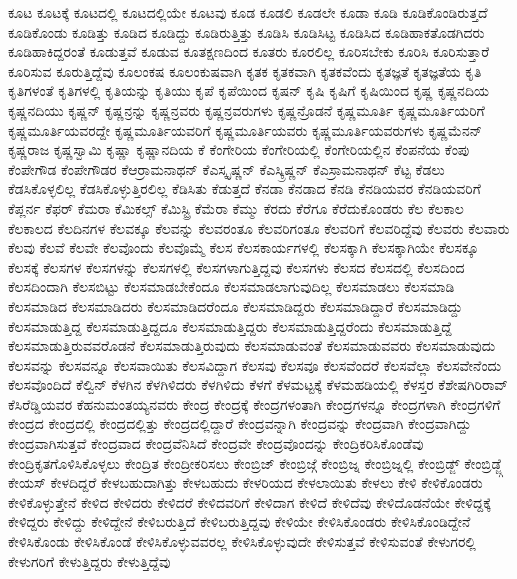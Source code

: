 {ಕೂಟ
ಕೂಟಕ್ಕೆ
ಕೂಟದಲ್ಲಿ
ಕೂಟದಲ್ಲಿಯೇ
ಕೂಟವು
ಕೂಡ
ಕೂಡಲಿ
ಕೂಡಲೇ
ಕೂಡಾ
ಕೂಡಿ
ಕೂಡಿಕೊಂಡಿರುತ್ತದೆ
ಕೂಡಿಕೊಂಡು
ಕೂಡಿತ್ತು
ಕೂಡಿದ
ಕೂಡಿದ್ದು
ಕೂಡಿರುತ್ತಿತ್ತು
ಕೂಡಿಸಿ
ಕೂಡಿಸಿಟ್ಟ
ಕೂಡಿಸಿದ
ಕೂಡಿಹಾಕತೊಡಗಿದರು
ಕೂಡಿಹಾಕಿದ್ದರಂತೆ
ಕೂಡುತ್ತವೆ
ಕೂಡುವ
ಕೂತಕ್ಷಣದಿಂದ
ಕೂತರು
ಕೂರಲಿಲ್ಲ
ಕೂರಿಸಬೇಕು
ಕೂರಿಸಿ
ಕೂರಿಸುತ್ತಾರೆ
ಕೂರಿಸುವ
ಕೂರುತ್ತಿದ್ದೆವು
ಕೂಲಂಕಷ
ಕೂಲಂಕುಷವಾಗಿ
ಕೃತಕ
ಕೃತಕವಾಗಿ
ಕೃತಕವೆಂದು
ಕೃತಜ್ಞತೆ
ಕೃತಜ್ಞತೆಯ
ಕೃತಿ
ಕೃತಿಗಳಂತೆ
ಕೃತಿಗಳಲ್ಲಿ
ಕೃತಿಯನ್ನು
ಕೃತಿಯು
ಕೃಪೆ
ಕೃಪೆಯಿಂದ
ಕೃಷನ್
ಕೃಷಿ
ಕೃಷಿಗೆ
ಕೃಷಿಯಿಂದ
ಕೃಷ್ಣ
ಕೃಷ್ಣನದಿಯ
ಕೃಷ್ಣನದಿಯು
ಕೃಷ್ಣನ್
ಕೃಷ್ಣನ್ರನ್ನು
ಕೃಷ್ಣನ್ರವರು
ಕೃಷ್ಣನ್ರವರುಗಳು
ಕೃಷ್ಣನ್ರೊಡನೆ
ಕೃಷ್ಣಮೂರ್ತಿ
ಕೃಷ್ಣಮೂರ್ತಿಯರಿಗೆ
ಕೃಷ್ಣಮೂರ್ತಿಯವರದ್ದೇ
ಕೃಷ್ಣಮೂರ್ತಿಯವರಿಗೆ
ಕೃಷ್ಣಮೂರ್ತಿಯವರು
ಕೃಷ್ಣಮೂರ್ತಿಯವರುಗಳು
ಕೃಷ್ಣಮೆನನ್
ಕೃಷ್ಣರಾಜ
ಕೃಷ್ಣಸ್ವಾಮಿ
ಕೃಷ್ಣಾ
ಕೃಷ್ಣಾನದಿಯ
ಕೆ
ಕೆಂಗೇರಿಯ
ಕೆಂಗೇರಿಯಲ್ಲಿ
ಕೆಂಗೇರಿಯಲ್ಲಿನ
ಕೆಂಪನೆಯ
ಕೆಂಪು
ಕೆಂಪೇಗೌಡ
ಕೆಂಪೇಗೌಡರ
ಕೆಆರ್ರಾಮನಾಥನ್
ಕೆಎಸ್ಕೃಷ್ಣನ್
ಕೆಎಸ್ಕ್ರಿಷ್ಣನ್
ಕೆಎಸ್ರಾಮನಾಥನ್
ಕೆಟ್ಟ
ಕೆಡಲು
ಕೆಡಸಿಕೊಳ್ಳಲಿಲ್ಲ
ಕೆಡಸಿಕೊಳ್ಳುತ್ತಿರಲಿಲ್ಲ
ಕೆಡಿಸಿತು
ಕೆಡುತ್ತದೆ
ಕೆನಡಾ
ಕೆನಡಾದ
ಕೆನಡಿ
ಕೆನಡಿಯವರ
ಕೆನಡಿಯವರಿಗೆ
ಕೆಪ್ಲರ್ನ
ಕೆಫರ್
ಕೆಮರಾ
ಕೆಮಿಕಲ್ಸ್
ಕೆಮಿಸ್ಟ್ರಿ
ಕೆಮೆರಾ
ಕೆಮ್ಮು
ಕೆರದು
ಕೆರೆಗೂ
ಕೆರೆದುಕೊಂಡರು
ಕೆಲ
ಕೆಲಕಾಲ
ಕೆಲಕಾಲದ
ಕೆಲದಿನಗಳ
ಕೆಲವಕ್ಕೂ
ಕೆಲವನ್ನು
ಕೆಲವರಂತೂ
ಕೆಲವರಿಗಂತೂ
ಕೆಲವರಿಗೆ
ಕೆಲವರಿದ್ದೆವು
ಕೆಲವರು
ಕೆಲವಾರು
ಕೆಲವು
ಕೆಲವೆ
ಕೆಲವೇ
ಕೆಲವೊಂದು
ಕೆಲವೊಮ್ಮೆ
ಕೆಲಸ
ಕೆಲಸಕಾರ್ಯಗಳಲ್ಲಿ
ಕೆಲಸಕ್ಕಾಗಿ
ಕೆಲಸಕ್ಕಾಗಿಯೇ
ಕೆಲಸಕ್ಕೂ
ಕೆಲಸಕ್ಕೆ
ಕೆಲಸಗಳ
ಕೆಲಸಗಳನ್ನು
ಕೆಲಸಗಳಲ್ಲಿ
ಕೆಲಸಗಳಾಗುತ್ತಿದ್ದವು
ಕೆಲಸಗಳು
ಕೆಲಸದ
ಕೆಲಸದಲ್ಲಿ
ಕೆಲಸದಿಂದ
ಕೆಲಸದಿಂದಾಗಿ
ಕೆಲಸಬಿಟ್ಟು
ಕೆಲಸಮಾಡಬೇಕೆಂದೂ
ಕೆಲಸಮಾಡಲಾಗುವುದಿಲ್ಲ
ಕೆಲಸಮಾಡಲು
ಕೆಲಸಮಾಡಿ
ಕೆಲಸಮಾಡಿದ
ಕೆಲಸಮಾಡಿದರು
ಕೆಲಸಮಾಡಿದರೆಂದೂ
ಕೆಲಸಮಾಡಿದ್ದರು
ಕೆಲಸಮಾಡಿದ್ದಾರೆ
ಕೆಲಸಮಾಡಿದ್ದು
ಕೆಲಸಮಾಡುತ್ತಿದ್ದ
ಕೆಲಸಮಾಡುತ್ತಿದ್ದದೂ
ಕೆಲಸಮಾಡುತ್ತಿದ್ದರು
ಕೆಲಸಮಾಡುತ್ತಿದ್ದರೆಂದು
ಕೆಲಸಮಾಡುತ್ತಿದ್ದೆ
ಕೆಲಸಮಾಡುತ್ತಿರುವವರೊಡನೆ
ಕೆಲಸಮಾಡುತ್ತಿರುವುದು
ಕೆಲಸಮಾಡುವಂತೆ
ಕೆಲಸಮಾಡುವವರು
ಕೆಲಸಮಾಡುವುದು
ಕೆಲಸವನ್ನು
ಕೆಲಸವನ್ನೂ
ಕೆಲಸವಾಯಿತು
ಕೆಲಸವಿದ್ದಾಗ
ಕೆಲಸವು
ಕೆಲಸವೂ
ಕೆಲಸವೆಂದರೆ
ಕೆಲಸವೆಲ್ಲಾ
ಕೆಲಸವೇನೆಂದು
ಕೆಲಸವೊಂದಿದೆ
ಕೆಲ್ವಿನ್
ಕೆಳಗಿನ
ಕೆಳಗಿಳಿದರು
ಕೆಳಗಿಳಿದು
ಕೆಳಗೆ
ಕೆಳಮಟ್ಟಕ್ಕೆ
ಕೆಳಮಹಡಿಯಲ್ಲಿ
ಕೆಳಸ್ತರ
ಕೆಶೇಷಗಿರಿರಾವ್
ಕೆಸಿರೆಡ್ಡಿಯವರ
ಕೆಹನುಮಂತಯ್ಯನವರು
ಕೇಂದ್ರ
ಕೇಂದ್ರಕ್ಕೆ
ಕೇಂದ್ರಗಳಂತಾಗಿ
ಕೇಂದ್ರಗಳನ್ನೂ
ಕೇಂದ್ರಗಳಾಗಿ
ಕೇಂದ್ರಗಳಿಗೆ
ಕೇಂದ್ರದ
ಕೇಂದ್ರದಲ್ಲಿ
ಕೇಂದ್ರದಲ್ಲಿತ್ತು
ಕೇಂದ್ರದಲ್ಲಿದ್ದಾರೆ
ಕೇಂದ್ರವನ್ನಾಗಿ
ಕೇಂದ್ರವನ್ನು
ಕೇಂದ್ರವಾಗಿ
ಕೇಂದ್ರವಾಗಿದ್ದು
ಕೇಂದ್ರವಾಗಿಸುತ್ತವೆ
ಕೇಂದ್ರವಾದ
ಕೇಂದ್ರವೆನಿಸಿದೆ
ಕೇಂದ್ರವೇ
ಕೇಂದ್ರವೊಂದನ್ನು
ಕೇಂದ್ರಿಕರಿಸಿಕೊಂಡೆವು
ಕೇಂದ್ರಿಕೃತಗೊಳಿಸಿಕೊಳ್ಳಲು
ಕೇಂದ್ರಿತ
ಕೇಂದ್ರೀಕರಿಸಲು
ಕೇಂಬ್ರಿಜ್
ಕೇಂಬ್ರಿಜ್ಗೆ
ಕೇಂಬ್ರಿಜ್ನ
ಕೇಂಬ್ರಿಜ್ನಲ್ಲಿ
ಕೇಂಬ್ರಿಡ್ಜ್
ಕೇಂಬ್ರಿಡ್ಜ್ಗೆ
ಕೇಯಸ್
ಕೇಳದಿದ್ದರೆ
ಕೇಳಬಹುದಾಗಿತ್ತು
ಕೇಳಬಹುದು
ಕೇಳರಿಯದ
ಕೇಳಲಾಯಿತು
ಕೇಳಲು
ಕೇಳಿ
ಕೇಳಿಕೊಂಡರು
ಕೇಳಿಕೊಳ್ಳುತ್ತೇನೆ
ಕೇಳಿದ
ಕೇಳಿದರು
ಕೇಳಿದರೆ
ಕೇಳಿದವರಿಗೆ
ಕೇಳಿದಾಗ
ಕೇಳಿದೆ
ಕೇಳಿದೆವು
ಕೇಳಿದೊಡನೆಯೇ
ಕೇಳಿದ್ದಕ್ಕೆ
ಕೇಳಿದ್ದರು
ಕೇಳಿದ್ದು
ಕೇಳಿದ್ದೇನೆ
ಕೇಳಿಬರುತ್ತಿದೆ
ಕೇಳಿಬರುತ್ತಿದ್ದವು
ಕೇಳಿಯೇ
ಕೇಳಿಸಿಕೊಂಡರು
ಕೇಳಿಸಿಕೊಂಡಿದ್ದೇನೆ
ಕೇಳಿಸಿಕೊಂಡು
ಕೇಳಿಸಿಕೊಂಡೆ
ಕೇಳಿಸಿಕೊಳ್ಳುವವರಲ್ಲ
ಕೇಳಿಸಿಕೊಳ್ಳುವುದೇ
ಕೇಳಿಸುತ್ತವೆ
ಕೇಳಿಸುವಂತೆ
ಕೇಳುಗರಲ್ಲಿ
ಕೇಳುಗರಿಗೆ
ಕೇಳುತ್ತಿದ್ದರು
ಕೇಳುತ್ತಿದ್ದೆವು
}
